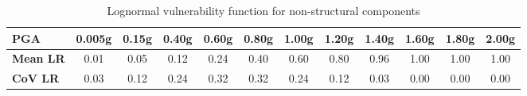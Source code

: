 \begin{table}[htbp]

\centering
\begin{tabular}{ l c c c c c c c c c c c}

\hline
\rowcolor{anti-flashwhite}
\bf{PGA} & \bf{0.005g} & \bf{0.15g} & \bf{0.40g} & \bf{0.60g} & \bf{0.80g} & \bf{1.00g} & \bf{1.20g} & \bf{1.40g} & \bf{1.60g} & \bf{1.80g} & \bf{2.00g} \\
\hline
\bf{Mean LR} & 0.01 & 0.05 & 0.12 & 0.24 & 0.40 & 0.60 & 0.80 & 0.96 & 1.00 & 1.00 & 1.00 \\
\bf{CoV LR} & 0.03 & 0.12 & 0.24 & 0.32 & 0.32 & 0.24 & 0.12 & 0.03 & 0.00 & 0.00 & 0.00 \\
\hline
\end{tabular}

\caption{Lognormal vulnerability function for non-structural components}
\label{tab:vf-ln-tax1-nst}
\end{table}